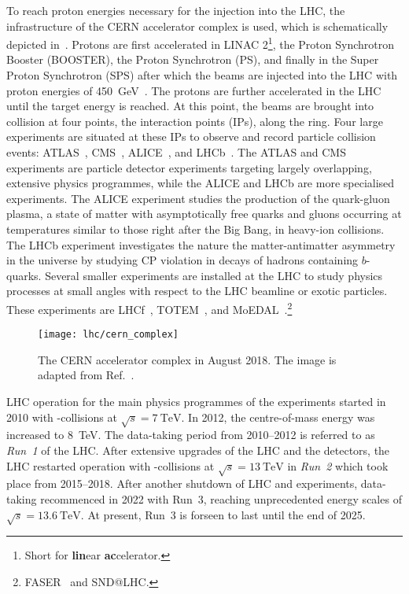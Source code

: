 To reach proton energies necessary for the injection into the LHC, the
infrastructure of the CERN accelerator complex is used, which is schematically
depicted in~. Protons are first accelerated
in LINAC 2\footnote{Short for \textbf{lin}ear \textbf{ac}celerator.}, the Proton
Synchrotron Booster (BOOSTER), the Proton Synchrotron (PS), and finally in the
Super Proton Synchrotron (SPS) after which the beams are injected into the LHC
with proton energies of \SI{450}{\GeV}~\cite{Evans:2008zzb}. The protons are
further accelerated in the LHC until the target energy is reached. At this
point, the beams are brought into collision at four points, the interaction
points (IPs), along the ring. Four large experiments are situated at these IPs
to observe and record particle collision events: ATLAS~\cite{PERF-2007-01},
CMS~\cite{CMS-CMS-00-001}, ALICE~\cite{ALICE:2008ngc}, and
LHCb~\cite{LHCb:2008vvz}. The ATLAS and CMS experiments are particle detector
experiments targeting largely overlapping, extensive physics programmes, while
the ALICE and LHCb are more specialised experiments. The ALICE experiment
studies the production of the quark-gluon plasma, a state of matter with
asymptotically free quarks and gluons occurring at temperatures similar to those
right after the Big Bang, in heavy-ion collisions. The LHCb experiment
investigates the nature the matter-antimatter asymmetry in the universe by
studying CP violation in decays of hadrons containing $b$-quarks. Several
smaller experiments are installed at the LHC to study physics processes at small
angles with respect to the LHC beamline or exotic particles. These experiments
are LHCf~\cite{LHCf:2008lfy}, TOTEM~\cite{TOTEM:2008lue}, and
MoEDAL~\cite{MoEDAL:2009jwa}.\footnote{FASER~\cite{FASER:2019aik} and SND@LHC.}

\begin{figure}[htbp]
  \centering

  \texttt{[image: lhc/cern\_complex]}

  \caption{The CERN accelerator complex in August 2018. The image is adapted
    from Ref.~\cite{Mobs:2684277}.}%
  \label{fig:cern_accelerator_complex}
\end{figure}

LHC operation for the main physics programmes of the experiments started in 2010
with \pp-collisions at $\sqrt{s} = \SI{7}{\TeV}$. In 2012, the centre-of-mass
energy was increased to \SI{8}{\TeV}. The data-taking period from 2010--2012 is
referred to as \emph{Run~1} of the LHC. After extensive upgrades of the LHC and
the detectors, the LHC restarted operation with \pp-collisions at
$\sqrt{s} = \SI{13}{\TeV}$ in \emph{Run~2} which took place from
2015--2018. After another shutdown of LHC and experiments, data-taking
recommenced in 2022 with Run~3, reaching unprecedented energy scales of
$\sqrt{s} = \SI{13.6}{\TeV}$. At present, Run~3 is forseen to last until the end
of 2025.

